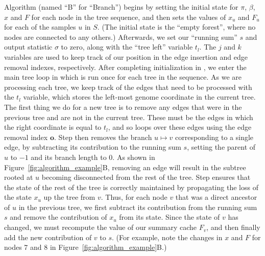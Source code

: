 \documentclass{article}
\newcommand{\indexout}[0]{\ensuremath{\mathbf{o}}}
\begin{document}
Algorithm  (named ``B'' for ``Branch'')
begins by setting the initial state for $\pi$, $\beta$,
$x$ and $F$ for each node in the tree sequence, and then sets the values
of $x_u$ and $F_u$ for each of the samples $u$ in $S$.
(The initial state is the ``empty forest'', where no nodes are connected to any others.)
Afterwards, we set our ``running sum'' $s$ and output statistic $\sigma$ to zero, along
with the ``tree left'' variable $t_l$. The $j$ and $k$ variables are
used to keep track of our position in the edge insertion and edge
removal indexes, respectively. After completing initialization in
, we enter the main tree loop in  which is
run once for each tree in the sequence. As we are processing each
tree, we keep track of the edges that need to be processed with
the $t_l$ variable, which stores the left-most genome coordinate
in the current tree. The first thing we do for a new tree is to
remove any edges that were in the previous tree and are not in the
current tree. These must be the edges in which the right coordinate
is equal to $t_l$, and so  loops over these edges using
the edge removal index $\indexout$. Step  then removes
the branch $u \mapsto v$ corresponding to a single edge, by
subtracting its contribution to the running sum $s$, setting the parent of
$u$ to $-1$ and its branch length to $0$. As shown in
Figure~\ref{fig:algorithm_example}B, removing an edge will result
in the subtree rooted at $u$ becoming disconnected from the rest of the
tree. Step  ensures that the state of the rest of the tree
is correctly maintained by propagating the loss of the state $x_u$
up the tree from $v$. Thus, for each node $v$ that was a
direct ancestor of $u$ in the previous tree, we first subtract
its contribution from the running sum $s$ and remove the contribution
of $x_u$ from its state. Since the state of $v$ has changed, we must
recompute the value of our summary cache $F_v$, and then finally
add the new contribution of $v$ to $s$. (For example, note the changes in $x$
and $F$ for nodes 7 and 8 in Figure~\ref{fig:algorithm_example}B.)
\end{document}
